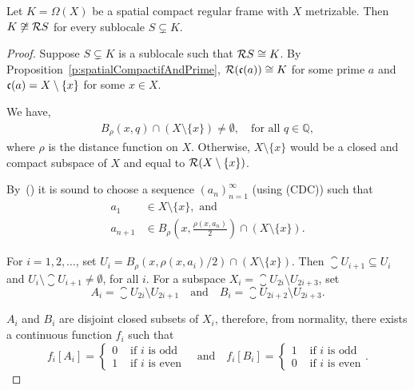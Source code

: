 \begin{theorem}
    Let $K = \Omega(X)$ be a spatial compact regular frame with $X$ metrizable. Then $K\not\cong \mathcal{R} S$ for every sublocale $S\subsetneq K$.
\end{theorem}
\begin{proof}
    Suppose $S\subsetneq K$ is a sublocale such that $\mathcal{R} S\cong K$. By Proposition~\ref{p:spatialCompactifAndPrime}, $\mathcal{R}(\mathfrak{c}(a))\cong K$ for some prime $a$ and $\mathfrak{c}(a) = X\setminus \{x\}$ for some $x\in X$.

    We have,
    \begin{align}
        B_\rho(x, q)\cap (X\setminus \{x\}) \neq \emptyset,\quad\text{for all } q\in \mathbb{Q},\label{e:ballsIntersect}
    \end{align}
    where $\rho$ is the distance function on $X$. Otherwise, $X\setminus \{x\}$ would be a closed and compact subspace of $X$ and equal to $\mathcal{R}(X\setminus \{x\})$.

    By~() it is sound to choose a sequence $(a_n)_{n=1}^\infty$ (using (CDC)) such that
    \begin{align*}
        a_1 &\in X\setminus \{x\},\text{ and} \\
        a_{n+1} &\in B_\rho\left(x, \frac{\rho(x,a_n)}{2}\right)\cap (X\setminus \{x\}).
    \end{align*}

    \noindent For $i = 1,2,\dots$, set $U_i = B_\rho(x,\rho(x,a_i)/2)\cap (X\setminus \{x\})$. Then $\closure{U}_{i+1}\subseteq U_i$ and $U_i\setminus \closure{U}_{i+1} \neq \emptyset$, for all $i$.
    For a subspace $X_i = \closure{U}_{2i}\setminus U_{2i+3}$, set
    $$ A_i = \closure{U}_{2i}\setminus U_{2i+1}\quad\text{and}\quad B_i = \closure{U}_{2i+2}\setminus U_{2i+3}. $$

    \noindent $A_i$ and $B_i$ are disjoint closed subsets of $X_i$, therefore, from normality, there exists a continuous function $f_i$ such that
    $$ f_i[A_i] = \begin{cases} 0 & \text{ if }i\text{ is odd} \\ 1 & \text{ if }i\text{ is even}\end{cases}
       \quad\text{and}\quad
       f_i[B_i] = \begin{cases} 1 & \text{ if }i\text{ is odd} \\ 0 & \text{ if }i\text{ is even}\end{cases}. $$


\end{proof}
